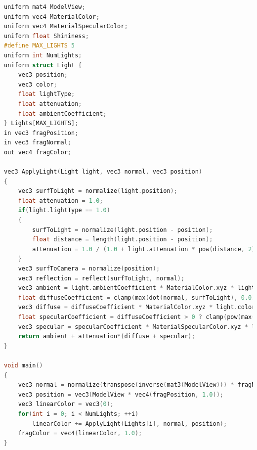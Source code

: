 \begin{lstlisting}[language=cpp, caption={Phong lightning}]
uniform mat4 ModelView;
uniform vec4 MaterialColor;
uniform vec4 MaterialSpecularColor;
uniform float Shininess;
#define MAX_LIGHTS 5
uniform int NumLights;
uniform struct Light {
	vec3 position;
	vec3 color;
	float lightType;
	float attenuation;
	float ambientCoefficient;
} Lights[MAX_LIGHTS];
in vec3 fragPosition;
in vec3 fragNormal;
out vec4 fragColor;

vec3 ApplyLight(Light light, vec3 normal, vec3 position)
{
	vec3 surfToLight = normalize(light.position);
	float attenuation = 1.0;
	if(light.lightType == 1.0)
	{
		surfToLight = normalize(light.position - position);
		float distance = length(light.position - position);
		attenuation = 1.0 / (1.0 + light.attenuation * pow(distance, 2));
	}
	vec3 surfToCamera = normalize(position);
	vec3 reflection = reflect(surfToLight, normal);
	vec3 ambient = light.ambientCoefficient * MaterialColor.xyz * light.color;
	float diffuseCoefficient = clamp(max(dot(normal, surfToLight), 0.0), 0.0, 1.0);
	vec3 diffuse = diffuseCoefficient * MaterialColor.xyz * light.color;
	float specularCoefficient = diffuseCoefficient > 0 ? clamp(pow(max(dot(reflection, surfToCamera), 0.0), Shininess), 0.0, 1.0) : 0.0;
	vec3 specular = specularCoefficient * MaterialSpecularColor.xyz * light.color;
	return ambient + attenuation*(diffuse + specular);
}

void main() 
{ 
	vec3 normal = normalize(transpose(inverse(mat3(ModelView))) * fragNormal);
	vec3 position = vec3(ModelView * vec4(fragPosition, 1.0));
	vec3 linearColor = vec3(0);
	for(int i = 0; i < NumLights; ++i)
		linearColor += ApplyLight(Lights[i], normal, position);
	fragColor = vec4(linearColor, 1.0);
} 
\end{lstlisting}


